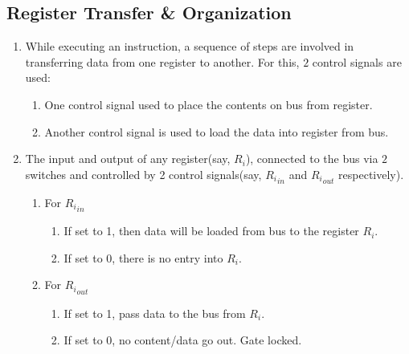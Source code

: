 \documentclass[12 pt, letterpaper]{extarticle}
\begin{document}
\subsection*{Register Transfer \& Organization}
\begin{enumerate}
	\item While executing an instruction, a sequence of steps are involved in transferring data from one register to another. For this, $2$ control signals are used:
	      \begin{enumerate}
		      \item One control signal used to place the contents on bus from register.
		      \item Another control signal is used to load the data into register from bus.
	      \end{enumerate}
	\item The input and output of any register(say, $R_i$), connected to the bus via $2$ switches and controlled by 2 control signals(say, ${R_i}_{in}$ and ${R_i}_{out}$ respectively).
	      \begin{enumerate}
		      \item For ${R_i}_{in}$
		            \begin{enumerate}
			            \item If set to 1, then data will be loaded from bus to the register $R_i$.
			            \item If set to 0, there is no entry into $R_i$.
		            \end{enumerate}
		      \item For ${R_i}_{out}$
		            \begin{enumerate}
			            \item If set to 1, pass data to the bus from $R_i$.
			            \item If set to 0, no content/data go out. Gate locked.
		            \end{enumerate}
	      \end{enumerate}
\end{enumerate}
\end{document}
